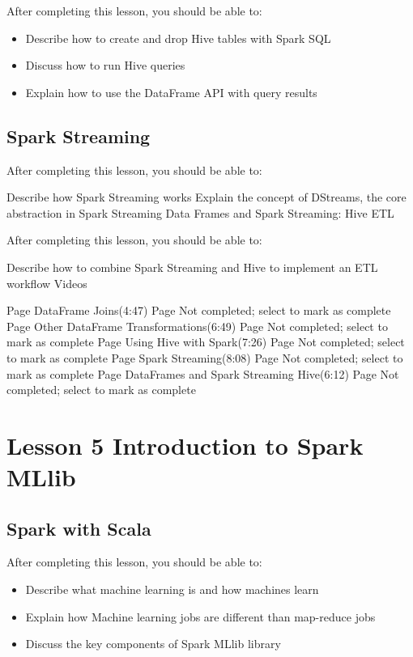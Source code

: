 After completing this lesson, you should be able to:
\begin{itemize}
\item Describe how to create and drop Hive tables with Spark SQL
\item Discuss how to run Hive queries
\item Explain how to use the DataFrame API with query results
\end{itemize}

\subsection{Spark Streaming}
After completing this lesson, you should be able to:

Describe how Spark Streaming works
Explain the concept of DStreams, the core abstraction in Spark Streaming
Data Frames and Spark Streaming: Hive ETL

After completing this lesson, you should be able to:

Describe how to combine Spark Streaming and Hive to implement an ETL workflow
Videos

Page DataFrame Joins(4:47) Page Not completed; select to mark as complete
Page Other DataFrame Transformations(6:49) Page Not completed; select to mark as complete
Page Using Hive with Spark(7:26) Page Not completed; select to mark as complete
Page Spark Streaming(8:08) Page Not completed; select to mark as complete
Page DataFrames and Spark Streaming Hive(6:12) Page Not completed; select to mark as complete


\newpage
\section{Lesson 5 Introduction to Spark MLlib}

\subsection{Spark with Scala}

After completing this lesson, you should be able to:
\begin{itemize}
\item Describe what machine learning is and how machines learn
\item Explain how Machine learning jobs are different than map-reduce jobs
\item Discuss the key components of Spark MLlib library
\end{itemize}
